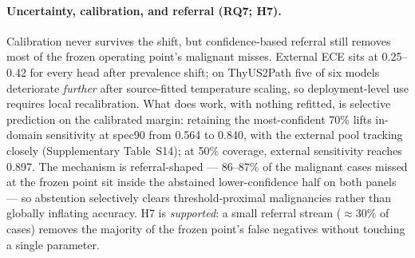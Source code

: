 \documentclass[jimh,article,submit,moreauthors,pdftex]{Definitions/tsp}
\begin{document}
\paragraph{Uncertainty, calibration, and referral (RQ7; H7).}
Calibration never survives the shift, but confidence-based referral still
removes most of the frozen operating point's malignant misses. External
ECE sits at 0.25--0.42 for every head after prevalence shift; on
ThyUS2Path five of six models deteriorate \emph{further} after
source-fitted temperature scaling, so deployment-level use requires local
recalibration. What does work, with nothing refitted, is selective
prediction on the calibrated margin: retaining the most-confident 70\%
lifts in-domain sensitivity at spec90 from 0.564 to 0.840, with the
external pool tracking closely (Supplementary Table~S14); at 50\%
coverage, external sensitivity reaches 0.897. The mechanism is
referral-shaped --- 86--87\% of the malignant cases missed at the frozen
point sit inside the abstained lower-confidence half on both panels ---
so abstention selectively clears threshold-proximal malignancies rather
than globally inflating accuracy. H7 is \emph{supported}: a small
referral stream (${\approx}30$\% of cases) removes the majority of the
frozen point's false negatives without touching a single parameter.
\end{document}
